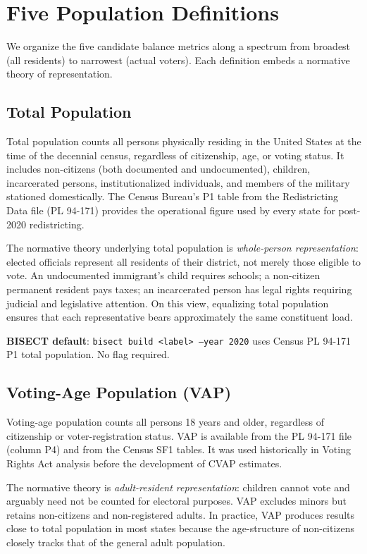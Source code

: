 \section{Five Population Definitions}
\label{sec:five-defs}

We organize the five candidate balance metrics along a spectrum from broadest (all residents) to narrowest (actual voters). Each definition embeds a normative theory of representation.

\subsection{Total Population}

Total population counts all persons physically residing in the United States at the time of the decennial census, regardless of citizenship, age, or voting status. It includes non-citizens (both documented and undocumented), children, incarcerated persons, institutionalized individuals, and members of the military stationed domestically. The Census Bureau's P1 table from the Redistricting Data file (PL 94-171) provides the operational figure used by every state for post-2020 redistricting.

The normative theory underlying total population is \emph{whole-person representation}: elected officials represent all residents of their district, not merely those eligible to vote. An undocumented immigrant's child requires schools; a non-citizen permanent resident pays taxes; an incarcerated person has legal rights requiring judicial and legislative attention. On this view, equalizing total population ensures that each representative bears approximately the same constituent load.

\textbf{BISECT default}: \texttt{bisect build <label> --year 2020} uses Census PL 94-171 P1 total population. No flag required.

\subsection{Voting-Age Population (VAP)}

Voting-age population counts all persons 18 years and older, regardless of citizenship or voter-registration status. VAP is available from the PL 94-171 file (column P4) and from the Census SF1 tables. It was used historically in Voting Rights Act analysis before the development of CVAP estimates.

The normative theory is \emph{adult-resident representation}: children cannot vote and arguably need not be counted for electoral purposes. VAP excludes minors but retains non-citizens and non-registered adults. In practice, VAP produces results close to total population in most states because the age-structure of non-citizens closely tracks that of the general adult population.

